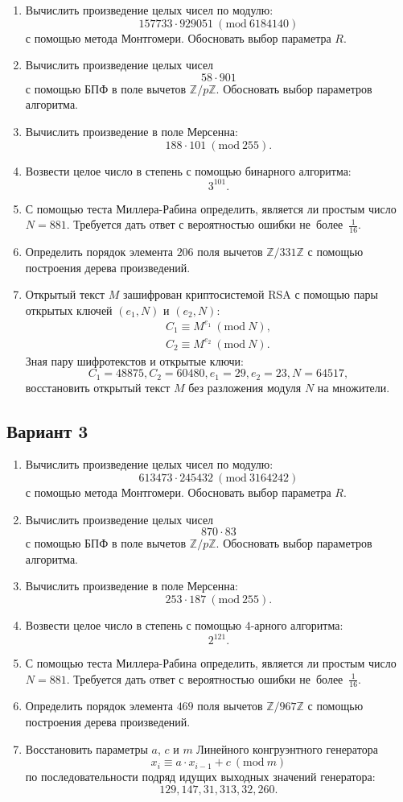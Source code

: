 \documentclass[14pt]{extarticle}
\begin{document}
	\begin{enumerate}
		\item Вычислить произведение целых чисел по модулю: \[157733 \cdot 929051\ (\textrm{mod}\ 6184140)\] с помощью метода Монтгомери. Обосновать выбор параметра $R$.
		\item Вычислить произведение целых чисел \[58 \cdot 901\] с помощью БПФ в поле вычетов $\mathbb{Z}/p\mathbb{Z}$. Обосновать выбор параметров алгоритма.
		\item Вычислить произведение в поле Мерсенна: \[188 \cdot 101\ (\textrm{mod}\ 255).\]
		\item Возвести целое число в степень с помощью бинарного алгоритма: \[3^{101}.\]
		\item С помощью теста Миллера-Рабина определить, является ли простым число $N = 881$. Требуется дать ответ с вероятностью ошибки не~более~$\frac{1}{16}$.
		\item Определить порядок элемента $206$ поля вычетов $\mathbb{Z}/331\mathbb{Z}$ с помощью построения дерева произведений.
		\item Открытый текст $M$ зашифрован криптосистемой RSA с помощью пары открытых ключей $(e_1, N)$ и $(e_2, N)$:  \[\begin{aligned} C_1 \equiv M^{e_1}\ (\textrm{mod}\ N), \\ C_2 \equiv M^{e_2}\ (\textrm{mod}\ N). \end{aligned}\] Зная пару шифротекстов и открытые ключи: \[C_1 = 48875, C_2 = 60480, e_1 = 29, e_2 = 23, N = 64517,\] восстановить открытый текст $M$ без разложения модуля $N$ на множители.
	\end{enumerate}
\clearpage	\subsection{Вариант 3}
	\begin{enumerate}
		\item Вычислить произведение целых чисел по модулю: \[613473 \cdot 245432\ (\textrm{mod}\ 3164242)\] с помощью метода Монтгомери. Обосновать выбор параметра $R$.
		\item Вычислить произведение целых чисел \[870 \cdot 83\] с помощью БПФ в поле вычетов $\mathbb{Z}/p\mathbb{Z}$. Обосновать выбор параметров алгоритма.
		\item Вычислить произведение в поле Мерсенна: \[253 \cdot 187\ (\textrm{mod}\ 255).\]
		\item Возвести целое число в степень с помощью $4$-арного алгоритма: \[2^{121}.\]
		\item С помощью теста Миллера-Рабина определить, является ли простым число $N = 881$. Требуется дать ответ с вероятностью ошибки не~более~$\frac{1}{16}$.
		\item Определить порядок элемента $469$ поля вычетов $\mathbb{Z}/967\mathbb{Z}$ с помощью построения дерева произведений.
		\item Восстановить параметры $a$, $c$ и $m$ Линейного конгруэнтного генератора \[x_i \equiv a \cdot x_{i-1} + c\ (\textrm{mod}\ m)\] по последовательности подряд идущих выходных значений генератора: \[129, 147, 31, 313, 32, 260.\]
	\end{enumerate}
\end{document}
